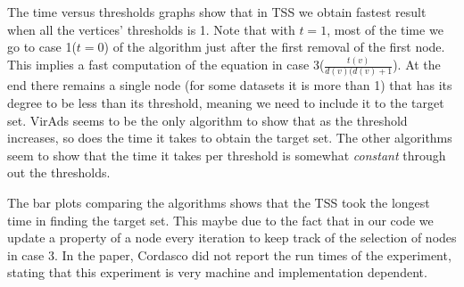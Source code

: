 The time versus thresholds graphs show that in TSS we obtain fastest result when all the vertices' thresholds is 1. Note that with $t=1$, most of the time we go to case 1($t=0$) of the algorithm just after the first removal of the first node. This implies a fast computation of the equation in case 3($\frac{t(v)}{d(v)(d(v)+1}$). At the end there remains a single node (for some datasets it is more than 1) that has its degree to be less than its threshold, meaning we need to include it to the target set. VirAds seems to be the only algorithm to show that as the threshold increases, so does the time it takes to obtain the target set. The other algorithms seem to show that the time it takes per threshold is somewhat \textit{constant} through out the thresholds.

The bar plots comparing the algorithms shows that the TSS took the longest time in finding the target set. This maybe due to the fact that in our code we update a property of a node every iteration to keep track of the selection of nodes in case 3. In the paper, Cordasco did not report the run times of the experiment, stating that this experiment is very machine and implementation dependent.